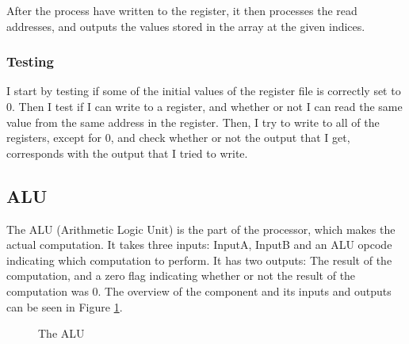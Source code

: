 After the process have written to the register, it then processes the read
addresses, and outputs the values stored in the array at the given indices.

\subsubsection*{Testing}
I start by testing if some of the initial values of the register file is
correctly set to 0. Then I test if I can write to a register, and whether or
not I can read the same value from the same address in the register.  Then, I
try to write to all of the registers, except for 0, and check whether or not
the output that I get, corresponds with the output that I tried to write.

\subsection{ALU}
The ALU (Arithmetic Logic Unit) is the part of the processor, which makes the
actual computation. It takes three inputs: InputA, InputB and an ALU opcode
indicating which computation to perform. It has two outputs: The result of the
computation, and a zero flag indicating whether or not the result of the
computation was 0. The overview of the component and its inputs and outputs can
be seen in Figure \ref{fig:alu}.

\begin{figure}
    \centering
    \caption{The ALU}
    \label{fig:alu}
\end{figure}

